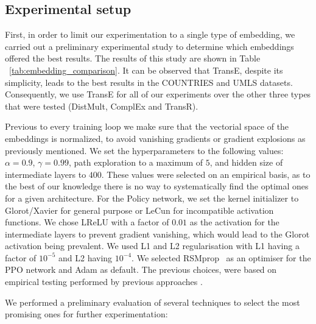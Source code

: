 \subsection{Experimental setup}


First, in order to limit our experimentation to a single type of embedding, we carried out a preliminary experimental study to determine which embeddings offered the best results. The results of this study are shown in Table ~\ref{tab:embedding_comparison}. It can be observed that TransE, despite its simplicity, leads to the best results in the COUNTRIES and UMLS datasets. Consequently, we use TransE for all of our experiments over the other three types that were tested (DistMult, ComplEx and TransR).

Previous to every training loop we make sure that the vectorial space of the embeddings is normalized, to avoid vanishing gradients or gradient explosions as previously mentioned. We set the hyperparameters to the following values: $\alpha=0.9$, $\gamma=0.99$, path exploration to a maximum of $5$, and hidden size of intermediate layers to $400$. These values were selected on an empirical basis, as to the best of our knowledge there is no way to systematically find the optimal ones for a given architecture.
For the Policy network, we set the kernel initializer to Glorot/Xavier \cite{glorot2010understanding} for general purpose or LeCun \cite{lecun2012efficient} for incompatible activation functions. We chose LReLU with a factor of $0.01$ as the activation for the intermediate layers to prevent gradient vanishing, which would lead to the Glorot activation being prevalent. We used L1 and L2 regularisation with L1 having a factor of $10^{-5}$ and L2 having $10^{-4}$. We selected RSMprop ~\cite{hinton2012neural}as an optimiser for the PPO network and Adam \cite{kingma2014adam} as default. The previous choices, were based on empirical testing performed by previous approaches \cite{jomaa2019hyp}.


We performed a preliminary evaluation of several techniques to select the most promising ones for further experimentation:

